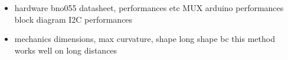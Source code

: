\begin{itemize}
    \item hardware
    \subitem bno055 datasheet, performances etc
    \subitem MUX
    \subitem arduino performances
    \subitem block diagram
    \subitem I2C performances
    \item mechanics
    \subitem dimensions, max curvature, shape
    \subitem long shape bc this method works well on long distances
\end{itemize}